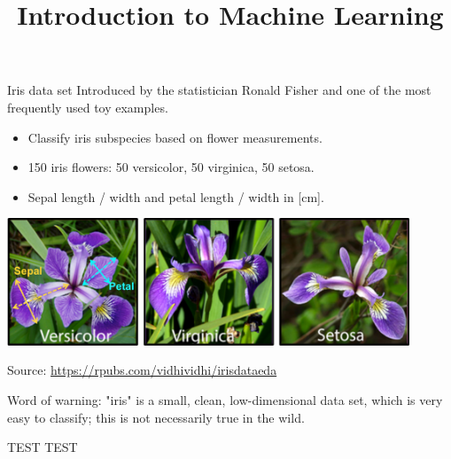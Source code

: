 




\newcommand{\titlefigure}{figure/sample-dgp-2d.pdf}
\newcommand{\learninggoals}{
\item Understand structure of tabular data in ML
\item Understand difference between target and features
\item Understand difference between labeled and unlabeled data
\item Know concept of data-generating process}

\title{Introduction to Machine Learning}
\date{}




\begin{vbframe}{Iris data set}
Introduced by the statistician Ronald Fisher and one
of the most frequently used toy examples.
\begin{itemize}
\item Classify iris subspecies based on flower measurements.
\item 150 iris flowers: 50 versicolor, 50 virginica, 50 setosa.
\item Sepal length / width and petal length / width in [cm].
\end{itemize}

\begin{center}
\includegraphics[width=0.9\textwidth]{figure_man/iris_species.png}

\tiny
Source: \url{https://rpubs.com/vidhividhi/irisdataeda}
\normalsize
\end{center}

Word of warning: "iris" is a small, clean, low-dimensional data set,
which is very easy to classify; this is not necessarily true in the wild.

TEST TEST

\end{vbframe}

